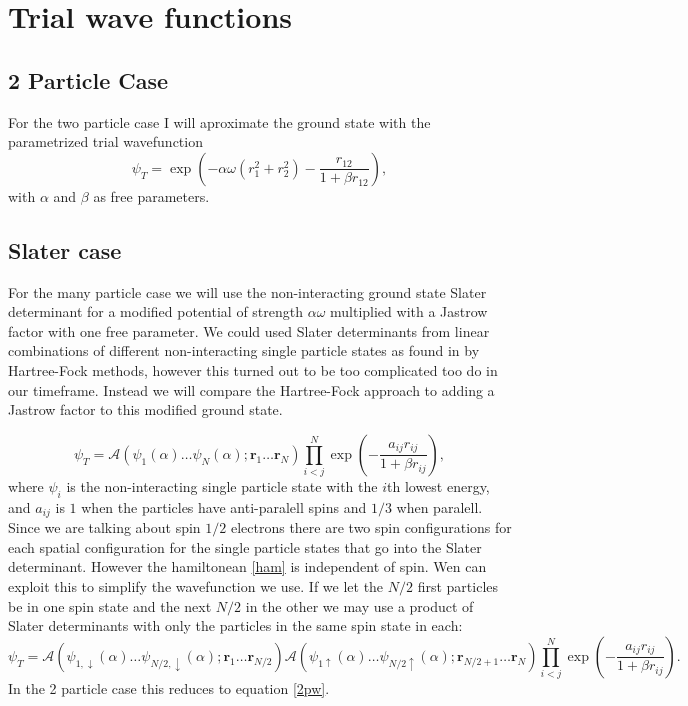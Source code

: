 \documentclass[a4paper,English,10pt]{article}
\newcommand{\bb}[1]{\boldsymbol{#1}}
\newcommand{\uar}{\uparrow}
\newcommand{\dar}{\downarrow}
\newcommand{\be}{\begin{equation}}
\newcommand{\ee}{\end{equation}}
\newcommand{\f}{\frac}
\begin{document}
\section{Trial wave functions}
\subsection{2 Particle Case}
For the two particle case I will aproximate the ground state with the parametrized trial wavefunction
\be
\psi_T = \exp\left(-\alpha\omega(r_1^2 + r_2^2) -\f{r_{12}}{1+\beta r_{12}}\right),\label{2pw}
\ee
with $\alpha$ and $\beta$ as free parameters.

\subsection{Slater case}

For the many particle case we will use the non-interacting ground state Slater determinant for a modified potential of strength $\alpha\omega$
multiplied with a Jastrow factor with one free parameter.
We could used Slater determinants from linear combinations of different non-interacting single particle states as found in \cite{proj1} by Hartree-Fock methods,
however this turned out to be too complicated too do in our timeframe. Instead we will compare the Hartree-Fock approach to adding a Jastrow factor to this modified ground state.

\be
\psi_T =  \mathcal{A}\left(\psi_1(\alpha)\ldots\psi_N(\alpha);\bb{r}_1\ldots\bb{r}_N\right)\prod_{i<j}^N\exp\left(-\f{a_{ij}r_{ij}}{1+\beta r_{ij}}\right),
\ee
where  $\psi_i$ is the non-interacting single particle state with the $i$th lowest energy,
and $a_{ij}$ is $1$ when the particles have anti-paralell spins and $1/3$ when paralell.
Since we are talking about spin $1/2$ electrons there are two spin configurations for each spatial configuration for the single particle states that go into the Slater determinant.
However the hamiltonean \ref{ham} is independent of spin. Wen can exploit this to simplify the wavefunction we use. If we let
the $N/2$ first particles be in one spin state and the next $N/2$ in the other we may use a product of Slater determinants with only the particles in the same spin state in each:
\be
\psi_T = \mathcal{A}\left(\psi_{1,\dar}(\alpha)\ldots\psi_{N/2,\dar}(\alpha);\bb{r}_1\ldots\bb{r}_{N/2}\right)\mathcal{A}\left(\psi_{1\uar}(\alpha)\ldots\psi_{N/2\uar}(\alpha);\bb{r}_{N/2+1}\ldots\bb{r}_N\right)\prod_{i<j}^N\exp\left(-\f{a_{ij}r_{ij}}{1+\beta r_{ij}}\right).\label{npw}
\ee
In the 2 particle case this reduces to equation \ref{2pw}.
\end{document}

